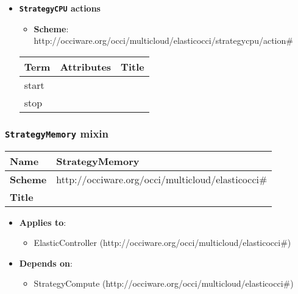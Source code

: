 \begin{itemize}
\item \textbf{\texttt{StrategyCPU} actions}

\begin{itemize}
	\item \textbf{Scheme}: http://occiware.org/occi/multicloud/elasticocci/strategycpu/action\#
\end{itemize}

\begin{center}
\begin{tabular}{|l|l|l|}
  \hline
  \textbf{Term}  & \textbf{Attributes} & \textbf{Title} \\
  \hline  
  start & &  \\
  \hline
  stop & &  \\
  \hline
\end{tabular}
\end{center}
\end{itemize}

 
\subsubsection{\texttt{StrategyMemory} mixin}
\begin{center}
\begin{tabular}{|l|l|}
  \hline
  \textbf{Name} & StrategyMemory \\
  \hline  
  \textbf{Scheme} & http://occiware.org/occi/multicloud/elasticocci\# \\
  \hline
  \textbf{Title} &  \\
  \hline
\end{tabular}
\end{center}
\begin{itemize}
\item \textbf{Applies to}:
\begin{itemize}
	\item ElasticController (http://occiware.org/occi/multicloud/elasticocci\#)
\end{itemize}
\end{itemize} 
\begin{itemize}
\item \textbf{Depends on}:
\begin{itemize}
	\item StrategyCompute (http://occiware.org/occi/multicloud/elasticocci\#)
\end{itemize}
\end{itemize}

